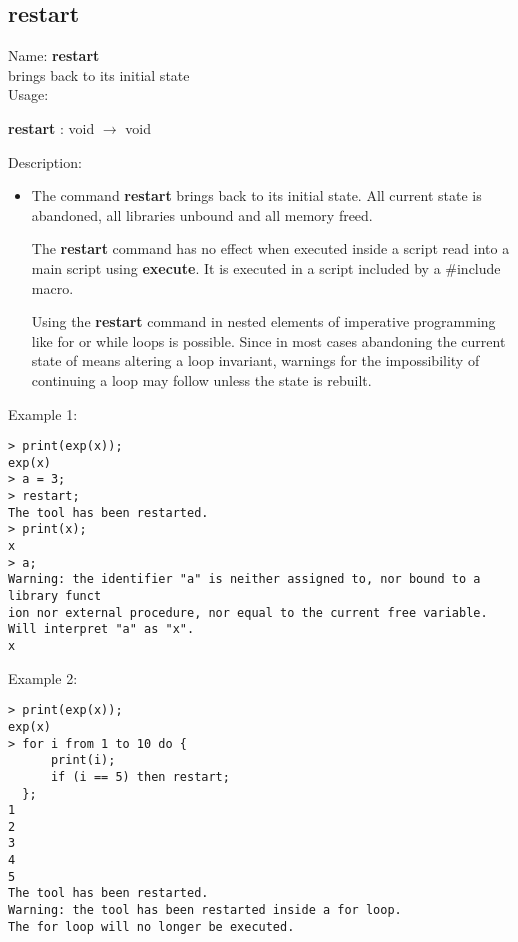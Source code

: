 \subsection{restart}
\label{labrestart}
\noindent Name: \textbf{restart}\\
\phantom{aaa}brings \sollya back to its initial state\\[0.2cm]
\noindent Usage: 
\begin{center}
\textbf{restart} : \textsf{void} $\rightarrow$ \textsf{void}\\
\end{center}
\noindent Description: \begin{itemize}

\item The command \textbf{restart} brings \sollya back to its initial state.  All
   current state is abandoned, all libraries unbound and all memory freed.
    
   The \textbf{restart} command has no effect when executed inside a \sollya
   script read into a main \sollya script using \textbf{execute}. It is executed
   in a \sollya script included by a $\#$include macro.
    
   Using the \textbf{restart} command in nested elements of imperative
   programming like for or while loops is possible. Since in most cases
   abandoning the current state of \sollya means altering a loop
   invariant, warnings for the impossibility of continuing a loop may
   follow unless the state is rebuilt.
\end{itemize}
\noindent Example 1: 
\begin{center}\begin{minipage}{15cm}\begin{Verbatim}[frame=single]
> print(exp(x));
exp(x)
> a = 3;
> restart;
The tool has been restarted.
> print(x);
x
> a;
Warning: the identifier "a" is neither assigned to, nor bound to a library funct
ion nor external procedure, nor equal to the current free variable.
Will interpret "a" as "x".
x
\end{Verbatim}
\end{minipage}\end{center}
\noindent Example 2: 
\begin{center}\begin{minipage}{15cm}\begin{Verbatim}[frame=single]
> print(exp(x));
exp(x)
> for i from 1 to 10 do {
      print(i);
      if (i == 5) then restart;
  };
1
2
3
4
5
The tool has been restarted.
Warning: the tool has been restarted inside a for loop.
The for loop will no longer be executed.
\end{Verbatim}
\end{minipage}\end{center}
